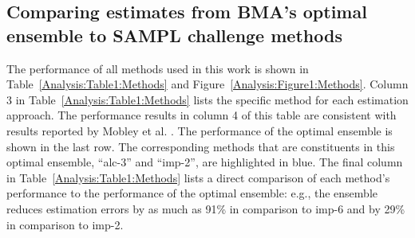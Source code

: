 \documentclass[journal=jpcbfk, manuscript=article]{achemso}
\newcommand{\+}[1]{\ensuremath{\mathbf{#1}}}
\begin{document}


\subsection{Comparing estimates from BMA's optimal ensemble to SAMPL challenge methods} \label{Results:BMA_Methods}
The performance of all methods used in this work is shown in Table~\ref{Analysis:Table1:Methods} and Figure~\ref{Analysis:Figure1:Methods}.
Column 3 in Table~\ref{Analysis:Table1:Methods} lists the specific method for each estimation approach.
The performance results in column 4 of this table are consistent with results reported by Mobley et al. \cite{Mobley:2014}.
The performance of the optimal ensemble is shown in the last row.
The corresponding methods that are constituents in this optimal ensemble, ``alc-3'' and ``imp-2'', are highlighted in blue.
The final column in Table~\ref{Analysis:Table1:Methods} lists a direct comparison of each method's performance to the performance of the optimal ensemble: e.g., the ensemble reduces estimation errors by as much as 91\% in comparison to imp-6 and by 29\% in comparison to imp-2. 
\end{document}
